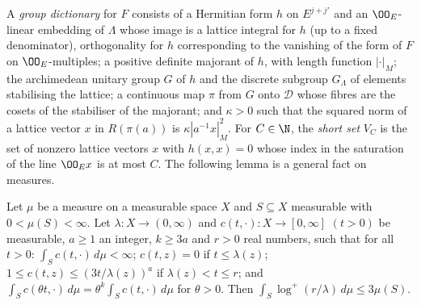 A \emph{group dictionary} for $F$ consists of a Hermitian form $h$ on $E^{j+j'}$ and an $\OO_E$-linear embedding of
$\Lambda$ whose image is a lattice integral for $h$ (up to a fixed denominator), orthogonality for $h$ corresponding to
the vanishing of the form of $F$ on $\OO_E$-multiples; a positive definite majorant of $h$, with length function
$|\cdot|_M$; the archimedean unitary group $G$ of $h$ and the discrete subgroup $G_\Lambda$ of elements stabilising the
lattice; a continuous map $\pi$ from $G$ onto $\mathcal D$ whose fibres are the cosets of the stabiliser of the
majorant; and $\kappa>0$ such that the squared norm of a lattice vector $x$ in $R(\pi(a))$ is $\kappa|a^{-1}x|_M^2$.
For $C\in\N$, the \emph{short set} $V_C$ is the set of nonzero lattice vectors $x$ with $h(x,x)=0$ whose index in the
saturation of the line $\OO_Ex$ is at most $C$. The following lemma is a general fact on measures.

\begin{lemma}\label{pf:towergeo:meanlog}
Let $\mu$ be a measure on a measurable space $X$ and $S\subseteq X$ measurable with $0<\mu(S)<\infty$. Let
$\lambda\colon X\to(0,\infty)$ and $c(t,\cdot)\colon X\to[0,\infty]$ $(t>0)$ be measurable, $a\ge1$ an integer, $k\ge3a$
and $r>0$ real numbers, such that for all $t>0$: $\int_Sc(t,\cdot)\,d\mu<\infty$; $c(t,z)=0$ if $t\le\lambda(z)$;
$1\le c(t,z)\le(3t/\lambda(z))^a$ if $\lambda(z)<t\le r$; and $\int_Sc(\theta t,\cdot)\,d\mu=\theta^k\int_Sc(t,\cdot)\,d\mu$
for $\theta>0$. Then $\int_S\log^+(r/\lambda)\,d\mu\le3\mu(S)$.
\end{lemma}

